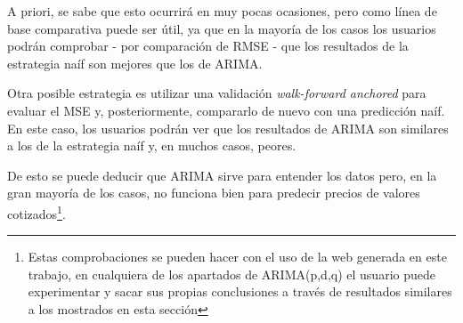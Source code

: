 A priori, se sabe que esto ocurrirá en muy pocas ocasiones, pero como línea de base comparativa puede ser útil, ya que en la mayoría de los casos los usuarios podrán comprobar - por comparación de RMSE - que los resultados de la estrategia naíf son mejores que los de ARIMA. 


Otra posible estrategia es utilizar una validación \emph{walk-forward anchored}\citep{online:walk_forward} para evaluar el MSE y, posteriormente, compararlo de nuevo con una predicción naíf. En este caso, los usuarios podrán ver que los resultados de ARIMA son similares a los de la estrategia naíf y, en muchos casos, peores. 


De esto se puede deducir que ARIMA sirve para entender los datos pero, en la gran mayoría de los casos, no funciona bien para predecir precios de valores cotizados\footnote{Estas comprobaciones se pueden hacer con el uso de la web generada en este trabajo, en cualquiera de los apartados de ARIMA(p,d,q) el usuario puede experimentar y sacar sus propias conclusiones a través de resultados similares a los mostrados en esta sección}. 


 

%
